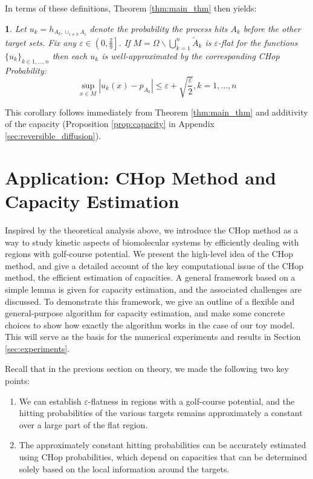 \documentclass[english, aip, jcp, priprint, graphicx,floatfix]{revtex4-1}
\theoremstyle{plain}
\theoremstyle{definition}
\theoremstyle{plain}
\newtheorem{cor}[thm]{\protect\corollaryname}
\providecommand{\corollaryname}{Corollary}
\begin{document}
In terms of these definitions, Theorem \ref{thm:main_thm} then yields:

\begin{cor}\label{thm:main_cor} Let $u_k = h_{A_k,\cup_{i\neq k} A_i}$ denote the probability the process hits $A_k$ before the other target sets.  Fix any $\varepsilon \in \left( 0, \frac{2}{9} \right]$.  If $M = \Omega \backslash \bigcup_{k = 1}^n \tilde{A}_k $ is $\varepsilon$-flat for the functions $\{u_k\}_{k\in1,\dots, n}$ then each $u_k$ is well-approximated by the corresponding CHop Probability:
\[ \sup_{x \in M} \left| u_k (x) - p_{A_k} \right| \leqslant \varepsilon + \sqrt{\frac{\varepsilon}{2}}, k=1,\dots, n\]
\end{cor}

This corollary follows immediately from Theorem \ref{thm:main_thm} and additivity of the capacity (Proposition \ref{prop:capacity} in Appendix \ref{sec:reversible_diffusion}). 

\section{Application: CHop Method and Capacity Estimation}\label{sec:algorithm}

Inspired by the theoretical analysis above, we introduce the CHop method as a way to study kinetic aspects of biomolecular systems by efficiently dealing with regions with golf-course potential. We present the high-level idea of the CHop method, and give a detailed account of the key computational issue of the CHop method, the efficient estimation of capacities. A general framework based on a simple lemma is given for capacity estimation, and the associated challenges are discussed. To demonstrate this framework, we give an outline of a flexible and general-purpose algorithm for capacity estimation, and make some concrete choices to show how exactly the algorithm works in the case of our toy model. This will serve as the basis for the numerical experiments and results in Section \ref{sec:experiments}.

Recall that in the previous section on theory, we made the following two key points:

\begin{enumerate}
	\item We can establish $\varepsilon$-flatness in regions with a golf-course potential, and the hitting probabilities of the various targets remains approximately a constant over a large part of the flat region.
	\item The approximately constant hitting probabilities can be accurately estimated using CHop probabilities, which depend on capacities that can be determined solely based on the local information around the targets.
\end{enumerate}
\end{document}
